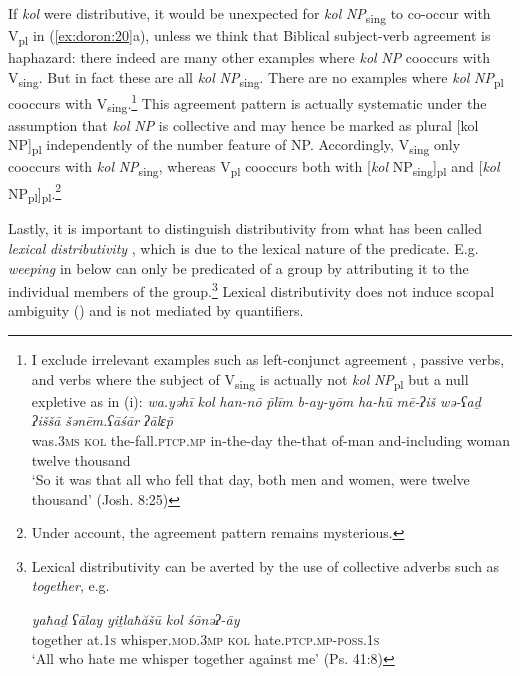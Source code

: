 \documentclass[output=paper]{langsci/langscibook}
\begin{document}
If \textit{kol} were distributive, it would be unexpected for \textit{kol} \textit{NP}\textsubscript{sing} to co-occur with V\textsubscript{pl} in (\ref{ex:doron:20}a), unless we think that Biblical subject-verb agreement is haphazard: there indeed are many  other examples where \textit{kol} \textit{NP} cooccurs with V\textsubscript{sing}. But in fact these are all \textit{kol} \textit{NP}\textsubscript{sing}. There are no examples where \textit{kol} \textit{NP}\textsubscript{pl} cooccurs with V\textsubscript{sing}.\footnote{I exclude irrelevant examples such as left-conjunct agreement \citep{Doron2005}, passive verbs, and verbs where the subject of \textrm{V}\textrm{\textsubscript{sing}} is actually not \textit{kol} \textit{NP}\textsubscript{pl} but a null expletive as in (i): 
\ea \gll \textit{wa.yəhī}   \textit{kol}   {\textit{han-nō} \textit{\={p}līm}}  \textit{b-ay-yōm}  \textit{ha-hū}    \textit{mē-ʔiš}  \textit{wə-ʕaḏ} \textit{ʔiššā}  \textit{šənēm.ʕāśār} \textit{ʔālɛ\={p}}\\
was.\textsc{3ms} \textsc{kol} the-fall.\textsc{ptcp.mp} in-the-day the-that of-man and-including woman twelve thousand\\
\glt `So it was that all who fell that day, both men and women, were twelve thousand' (Josh. 8:25)\z} This agreement pattern is actually systematic under the assumption that \textit{kol} \textit{NP} is collective and may hence be marked as plural [kol NP]\textsubscript{pl} independently of the number feature of NP. Accordingly, V\textsubscript{sing} only cooccurs with \textit{kol} \textit{NP}\textsubscript{sing}, whereas V\textsubscript{pl} cooccurs both with [\textit{kol} NP\textsubscript{sing}]\textsubscript{pl} and [\textit{kol} NP\textsubscript{pl}]\textsubscript{pl}.\footnote{Under  account, the agreement pattern remains mysterious.}

Lastly, it is important to distinguish distributivity from what has been called \textit{lexical} \textit{distributivity} \citep{Winter2000}, which is due to the lexical nature of the predicate. E.g. \textit{weeping} in  below can only be predicated of a group by attributing it to the individual members of the group.\footnote{Lexical distributivity can be averted by the use of collective adverbs such as \textit{together}, e.g.

\ea \gll  \textit{yaħaḏ}     \textit{ʕālay} \textit{yiṯlaħăšū}                 \textit{kol}   \textit{śōnəʔ-āy}\\
         together at.\textsc{1s}  whisper.\textsc{mod.3mp}  \textsc{kol}  hate.\textsc{ptcp.mp}-\textsc{poss.1s}\\ 
\glt `All who hate me whisper together against me' (Ps. 41:8)\z} Lexical distributivity does not induce scopal ambiguity (\citealt{Vries2017}) and is not mediated by quantifiers.
\end{document}
